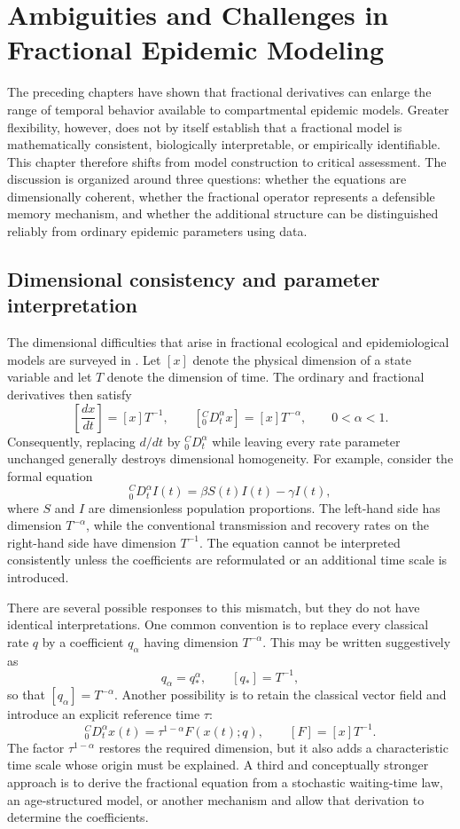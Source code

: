\documentclass[00-main.tex]{subfiles}
\begin{document}
\section{Ambiguities and Challenges in Fractional Epidemic Modeling}

The preceding chapters have shown that fractional derivatives can enlarge the range of temporal behavior available to compartmental epidemic models.
Greater flexibility, however, does not by itself establish that a fractional model is mathematically consistent, biologically interpretable, or empirically identifiable.
This chapter therefore shifts from model construction to critical assessment.
The discussion is organized around three questions: whether the equations are dimensionally coherent, whether the fractional operator represents a defensible memory mechanism, and whether the additional structure can be distinguished reliably from ordinary epidemic parameters using data.

\subsection{Dimensional consistency and parameter interpretation}

The dimensional difficulties that arise in fractional ecological and epidemiological models are surveyed in \cite{Gh25}.
Let $[x]$ denote the physical dimension of a state variable and let $T$ denote the dimension of time.
The ordinary and fractional derivatives then satisfy
\[
\left[\frac{dx}{dt}\right]=[x]T^{-1},
\qquad
\left[{}_{0}^{C}\!D_t^{\alpha}x\right]=[x]T^{-\alpha},
\qquad 0<\alpha<1.
\]
Consequently, replacing $d/dt$ by ${}_{0}^{C}\!D_t^{\alpha}$ while leaving every rate parameter unchanged generally destroys dimensional homogeneity.
For example, consider the formal equation
\[
{}_{0}^{C}\!D_t^{\alpha}I(t)
=\beta S(t)I(t)-\gamma I(t),
\]
where $S$ and $I$ are dimensionless population proportions.
The left-hand side has dimension $T^{-\alpha}$, while the conventional transmission and recovery rates on the right-hand side have dimension $T^{-1}$.
The equation cannot be interpreted consistently unless the coefficients are reformulated or an additional time scale is introduced.

There are several possible responses to this mismatch, but they do not have identical interpretations.
One common convention is to replace every classical rate $q$ by a coefficient $q_{\alpha}$ having dimension $T^{-\alpha}$.
This may be written suggestively as
\[
q_{\alpha}=q_*^{\alpha},
\qquad [q_*]=T^{-1},
\]
so that $[q_{\alpha}]=T^{-\alpha}$.
Another possibility is to retain the classical vector field and introduce an explicit reference time $\tau$:
\[
{}_{0}^{C}\!D_t^{\alpha}x(t)
=\tau^{1-\alpha}F(x(t);q),
\qquad [F]=[x]T^{-1}.
\]
The factor $\tau^{1-\alpha}$ restores the required dimension, but it also adds a characteristic time scale whose origin must be explained.
A third and conceptually stronger approach is to derive the fractional equation from a stochastic waiting-time law, an age-structured model, or another mechanism and allow that derivation to determine the coefficients.
\end{document}
